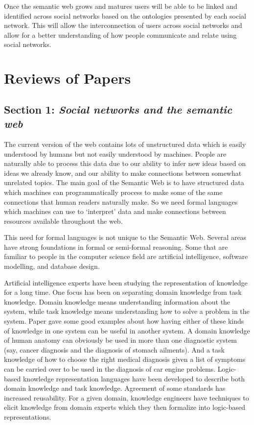 \documentclass[10pt,journal,compsoc]{IEEEtran}
\begin{document}
Once the semantic web grows and matures users will be able to be linked and identified across social networks based on the ontologies presented by each social network. This will allow the interconnection of users across social networks and allow for a better understanding of how people communicate and relate using social networks.


\section{Reviews of Papers}
\subsection{Section 1: \textit{Social networks and the semantic web} \cite{_social_2007}}
The current version of the web contains lots of unstructured data which is easily understood by humans but not easily understood by machines.  People are naturally able to process this data due to our ability to infer new ideas based on ideas we already know, and our ability to make connections between somewhat unrelated topics.  The main goal of the Semantic Web is to have structured data which machines can programmatically  process  to make some of the same connections that human readers naturally make.  So we need formal languages which machines can use to ‘interpret’ data and make connections between resources available throughout the web.

This need for formal languages is not unique to the Semantic Web.  Several areas have strong foundations in formal or semi-formal reasoning.  Some that are familiar to people in the computer science field are artificial intelligence, software modelling, and  database design.

Artificial intelligence experts have been studying the representation  of knowledge for a long time.  One focus has been on separating domain knowledge from task knowledge.  Domain knowledge means understanding information about the system, while task knowledge means understanding how to solve a problem in the system.  Paper \cite{_social_2007} gave some good examples about how having either of these kinds of knowledge in one system can be useful in another system.  A domain knowledge of human anatomy can obviously be used in more than one diagnostic system (say, cancer diagnosis and the diagnosis of stomach ailments).  And a task knowledge of how to choose the right medical diagnosis given a list of symptoms can be carried over to be used in the diagnosis of car engine problems.  Logic-based knowledge representation languages have been developed to describe both domain knowledge and task knowledge.  Agreement of some standards has increased reusability.  For a given domain, knowledge engineers have techniques to elicit knowledge from domain experts which they then formalize into logic-based representations.  
\end{document}
